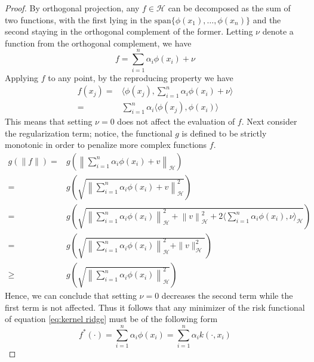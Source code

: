 \begin{proof}
    By orthogonal projection, any $f \in \mathcal{H}$ can be decomposed as the sum of two functions, with the first lying in the $\textrm{span}\{\phi(x_1),\dots, \phi(x_n)\}$ and the second staying in the orthogonal complement of the former. Letting $\nu$ denote a function from the orthogonal complement, we have
    \begin{equation}
        f=\sum\limits_{i=1}^{n}\alpha_i \phi(x_i)+\nu
    \end{equation}
    Applying $f$ to any point, by the reproducing property we have
    \begin{equation}
        \begin{aligned}
            f(x_j)=&\langle \phi(x_j), \sum\limits_{i=1}^{n}\alpha_i \phi(x_i)+\nu\rangle
            \\
            =&\sum\limits_{i=1}^{n}\alpha_i\langle \phi(x_j), \phi(x_i)\rangle
        \end{aligned}
    \end{equation}
    This means that setting $\nu=0$ does not affect the evaluation of $f$.
    Next consider the regularization term; notice, the functional $g$ is defined to be strictly monotonic in order to penalize more complex functions $f$.
    \begin{equation}
        \begin{aligned}
            g(\|f\|)=&g\left(\left\|\sum\limits_{i=1}^n \alpha_i \phi(x_i)+v\right\|_\mathcal{H}\right)
            \\
            =&g\left(\sqrt{\left\|\sum\limits_{i=1}^n \alpha_i \phi(x_i)+v\right\|_\mathcal{H}^2}\right)
            \\
            =&g\left(\sqrt{\left\|\sum\limits_{i=1}^n \alpha_i \phi(x_i)\right\|_{\mathcal{H}}^2+\left\|v\right\|_\mathcal{H}^2+2\langle\sum\limits_{i=1}^n \alpha_i \phi(x_i),\nu \rangle_{\mathcal{H}}}\right)
            \\
            =&g\left(\sqrt{\left\|\sum\limits_{i=1}^n \alpha_i \phi(x_i)\right\|_{\mathcal{H}}^2+\|v\|_\mathcal{H}^2}\right)
            \\
            \geq &g\left(\sqrt{\left\|\sum\limits_{i=1}^n \alpha_i \phi(x_i)\right\|_{\mathcal{H}}^2}\right)
        \end{aligned}
    \end{equation}
    Hence, we can conclude that setting $\nu=0$ decreases the second term while the first term is not affected. Thus it follows that any minimizer of the risk functional of equation \ref{eq:kernel ridge} must be of the following form
    \begin{equation}
        f^*(\cdot)=\sum\limits_{i=1}^n \alpha_i \phi(x_i)=\sum\limits_{i=1}^n \alpha_i k(\cdot, x_i)
    \end{equation}
\end{proof}

